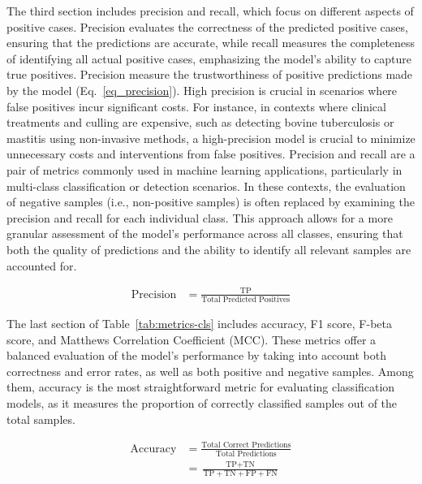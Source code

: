 The third section includes precision and recall, which focus on different aspects of positive cases. Precision evaluates the correctness of the predicted positive cases, ensuring that the predictions are accurate, while recall measures the completeness of identifying all actual positive cases, emphasizing the model’s ability to capture true positives. Precision measure the trustworthiness of positive predictions made by the model (Eq.~\ref{eq_precision}). High precision is crucial in scenarios where false positives incur significant costs. For instance, in contexts where clinical treatments and culling are expensive, such as detecting bovine tuberculosis \citep{denholm_predicting_2020} or mastitis \citep{kandeel_ability_2019} using non-invasive methods, a high-precision model is crucial to minimize unnecessary costs and interventions from false positives. Precision and recall are a pair of metrics commonly used in machine learning applications, particularly in multi-class classification or detection scenarios. In these contexts, the evaluation of negative samples (i.e., non-positive samples) is often replaced by examining the precision and recall for each individual class. This approach allows for a more granular assessment of the model’s performance across all classes, ensuring that both the quality of predictions and the ability to identify all relevant samples are accounted for.

\begin{equation} \label{eq_precision}
    \begin{split}
    \text{Precision} &= \frac{\text{TP}}{\text{Total Predicted Positives}}
    \end{split}
\end{equation}

The last section of Table~\ref{tab:metrics-cls} includes accuracy, F1 score, F-beta score, and Matthews Correlation Coefficient (MCC). These metrics offer a balanced evaluation of the model’s performance by taking into account both correctness and error rates, as well as both positive and negative samples. Among them, accuracy is the most straightforward metric for evaluating classification models, as it measures the proportion of correctly classified samples out of the total samples.

\begin{equation} \label{eq_accuracy}
    \begin{split}
\text{Accuracy} &= \frac{\text{Total Correct Predictions}}{\text{Total Predictions}} \\
        &= \frac{\text{TP} + \text{TN}}{\text{TP} + \text{TN} + \text{FP} + \text{FN}}
    \end{split}
\end{equation}

